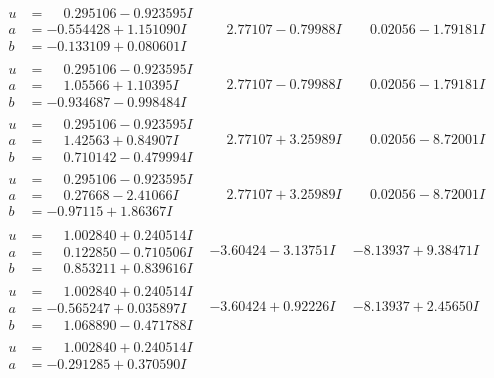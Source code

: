 \documentclass[1p]{elsarticle_modified}
\theoremstyle{definition}
\begin{document}
$$\begin{array}{c|c|c}
\begin{aligned}
u &= \phantom{-}0.295106 - 0.923595 I \\
a &= -0.554428 + 1.151090 I \\
b &= -0.133109 + 0.080601 I\end{aligned}
 & \phantom{-}2.77107 - 0.79988 I & \phantom{-}0.02056 - 1.79181 I \\ \hline\begin{aligned}
u &= \phantom{-}0.295106 - 0.923595 I \\
a &= \phantom{-}1.05566 + 1.10395 I \\
b &= -0.934687 - 0.998484 I\end{aligned}
 & \phantom{-}2.77107 - 0.79988 I & \phantom{-}0.02056 - 1.79181 I \\ \hline\begin{aligned}
u &= \phantom{-}0.295106 - 0.923595 I \\
a &= \phantom{-}1.42563 + 0.84907 I \\
b &= \phantom{-}0.710142 - 0.479994 I\end{aligned}
 & \phantom{-}2.77107 + 3.25989 I & \phantom{-}0.02056 - 8.72001 I \\ \hline\begin{aligned}
u &= \phantom{-}0.295106 - 0.923595 I \\
a &= \phantom{-}0.27668 - 2.41066 I \\
b &= -0.97115 + 1.86367 I\end{aligned}
 & \phantom{-}2.77107 + 3.25989 I & \phantom{-}0.02056 - 8.72001 I \\ \hline\begin{aligned}
u &= \phantom{-}1.002840 + 0.240514 I \\
a &= \phantom{-}0.122850 - 0.710506 I \\
b &= \phantom{-}0.853211 + 0.839616 I\end{aligned}
 & -3.60424 - 3.13751 I & -8.13937 + 9.38471 I \\ \hline\begin{aligned}
u &= \phantom{-}1.002840 + 0.240514 I \\
a &= -0.565247 + 0.035897 I \\
b &= \phantom{-}1.068890 - 0.471788 I\end{aligned}
 & -3.60424 + 0.92226 I & -8.13937 + 2.45650 I \\ \hline\begin{aligned}
u &= \phantom{-}1.002840 + 0.240514 I \\
a &= -0.291285 + 0.370590 I \\

\end{aligned}
\end{array}$$
\end{document}
